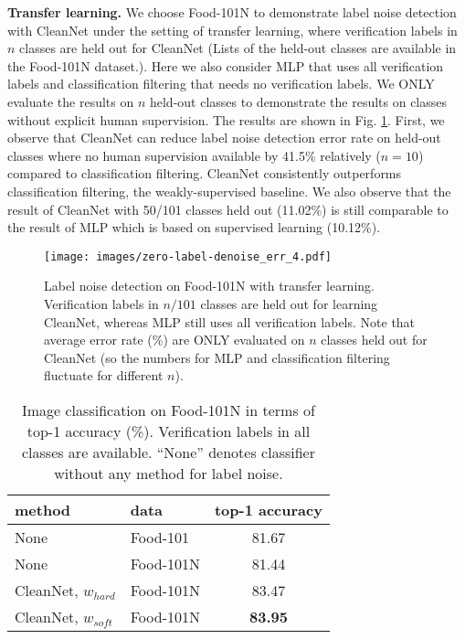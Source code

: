 \documentclass[10pt,twocolumn,letterpaper]{article}
\begin{document}
\noindent
\textbf{Transfer learning.} We choose Food-101N to demonstrate label noise detection with CleanNet under the setting of transfer learning, where verification labels in $n$ classes are held out for CleanNet (Lists of the held-out classes are available in the Food-101N dataset.). Here we also consider MLP that uses all verification labels and classification filtering that needs no verification labels. We ONLY evaluate the results on $n$ held-out classes to demonstrate the results on classes without explicit human supervision. The results are shown in Fig. \ref{fig:leave-n-out-denoise}. First, we observe that CleanNet can reduce label noise detection error rate on held-out classes where no human supervision available by 41.5\% relatively ($n=10$) compared to classification filtering. CleanNet consistently outperforms classification filtering, the weakly-supervised baseline. We also observe that the result of CleanNet with 50/101 classes held out (11.02\%) is still comparable to the result of MLP which is based on supervised learning (10.12\%).  


\begin{figure}[t]
\begin{center}
\texttt{[image: images/zero-label-denoise\_err\_4.pdf]}
\end{center}
\caption{Label noise detection on Food-101N with transfer learning. Verification labels in $n/101$ classes are held out for learning CleanNet, whereas MLP still uses all verification labels. Note that average error rate (\%) are ONLY evaluated on $n$ classes held out for CleanNet (so the numbers for MLP and classification filtering fluctuate for different $n$).}
\label{fig:leave-n-out-denoise}
\end{figure}


\begin{table}
\begin{center}
\small
\begin{tabular}{|l|l|c|}
\hline
method & data & top-1 accuracy \\
\hline\hline
None & Food-101 & 81.67 \\
None & Food-101N & 81.44 \\
\hline
CleanNet, $w_{hard}$ & Food-101N  & 83.47 \\
CleanNet, $w_{soft}$ & Food-101N  & \textbf{83.95} \\
\hline
\end{tabular}
\end{center}
\caption{Image classification on Food-101N in terms of top-1 accuracy (\%). Verification labels in all classes are available. ``None'' denotes classifier without any method for label noise.}
\label{tb:f101n-classification}
\end{table}
\end{document}
